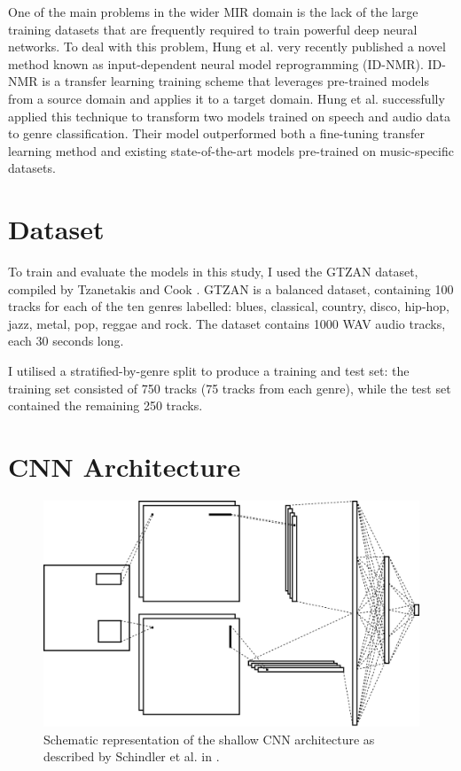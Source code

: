 \documentclass[conference]{IEEEtran}
\begin{document}
One of the main problems in the wider MIR domain is the lack of the large training datasets that are frequently required to train powerful deep neural networks.
To deal with this problem, Hung et al. \cite{HungYangChenLerch} very recently published a novel method known as input-dependent neural model reprogramming (ID-NMR).
ID-NMR is a transfer learning training scheme that leverages pre-trained models from a source domain and applies it to a target domain.
Hung et al. successfully applied this technique to transform two models trained on speech and audio data to genre classification.
Their model outperformed both a fine-tuning transfer learning method and existing state-of-the-art models pre-trained on music-specific datasets.

\section{Dataset}

To train and evaluate the models in this study, I used the GTZAN dataset, compiled by Tzanetakis and Cook \cite{TzanetakisCook}.
GTZAN is a balanced dataset, containing 100 tracks for each of the ten genres labelled: blues, classical, country, disco, hip-hop, jazz, metal, pop, reggae and rock.
The dataset contains 1000 WAV audio tracks, each 30 seconds long.

I utilised a stratified-by-genre split to produce a training and test set: the training set consisted of 750 tracks (75 tracks from each genre), while the test set contained the remaining 250 tracks.

\section{CNN Architecture}

\begin{figure}[htbp]
    \centerline{\includegraphics[width=\columnwidth]{architecture.jpg}}
    \caption{Schematic representation of the shallow CNN architecture as described by Schindler et al. in \cite{SchindlerLidyRauber}.}
    \label{architecture}
\end{figure}
\end{document}
